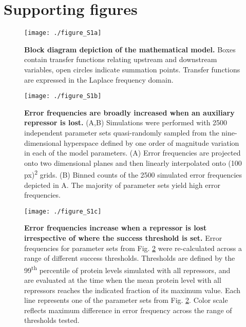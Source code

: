 \graphicspath{ {./figures/metabolism/} }


\section{Supporting figures}

\begin{figure}[h!]
\centering
\texttt{[image: ./figure\_S1a]}
\captionsetup{width=.65\linewidth}
\caption[Block diagram depiction of the mathematical model.]{\textbf{Block diagram depiction of the mathematical model.} Boxes contain transfer functions relating upstream and downstream variables, open circles indicate summation points. Transfer functions are expressed in the Laplace frequency domain.}
\label{fig:metabolism:figS1a}
\end{figure}

\begin{figure}[h!]
\centering
\texttt{[image: ./figure\_S1b]}
\caption[Robustness of reduced metabolism simulations to parameter values.]{\textbf{Error frequencies are broadly increased when an auxiliary repressor is lost.} (A,B) Simulations were performed with 2500 independent parameter sets quasi-randomly sampled from the nine-dimensional hyperspace defined by one order of magnitude variation in each of the model parameters. (A) Error frequencies are projected onto two dimensional planes and then linearly interpolated onto (100 px)\textsuperscript{2} grids. (B) Binned counts of the 2500 simulated error frequencies depicted in A. The majority of parameter sets yield high error frequencies.}
\label{fig:metabolism:figS1b}
\end{figure}

\begin{figure}[h!]
\centering
\texttt{[image: ./figure\_S1c]}
\captionsetup{width=.65\linewidth}
\caption[Robustness of reduced metabolism simulations to threshold definition.]{\textbf{Error frequencies increase when a repressor is lost irrespective of where the success threshold is set.} Error frequencies for parameter sets from Fig. \ref{fig:metabolism:figS1b} were re-calculated across a range of different success thresholds. Thresholds are defined by the 99\textsuperscript{th} percentile of protein levels simulated with all repressors, and are evaluated at the time when the mean protein level with all repressors reaches the indicated fraction of its maximum value. Each line represents one of the parameter sets from Fig. \ref{fig:metabolism:figS1b}. Color scale reflects maximum difference in error frequency across the range of thresholds tested.}
\label{fig:metabolism:figS1c}
\end{figure}

